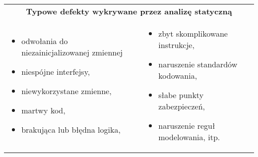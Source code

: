 \documentclass[../main.tex]{subfiles}
\begin{document}
    \begin{table}[H]
        \begin{center}
            \begin{tabular}{ p{8cm} p{8cm}}
                \multicolumn{2}{c}{\textbf{Typowe defekty wykrywane przez analizę statyczną}}\\
                \begin{itemize}
                    \item odwołania do niezainicjalizowanej zmiennej
                    \item niespójne interfejsy,
                    \item niewykorzystane zmienne,
                    \item martwy kod,
                    \item brakująca lub błędna logika,
                \end{itemize} &
                \begin{itemize}
                    \item zbyt skomplikowane instrukcje,
                    \item naruszenie standardów kodowania,
                    \item słabe punkty zabezpieczeń,
                    \item naruszenie reguł modelowania, itp.
                \end{itemize}
            \end{tabular}
        \end{center}
    \end{table}
\end{document}
